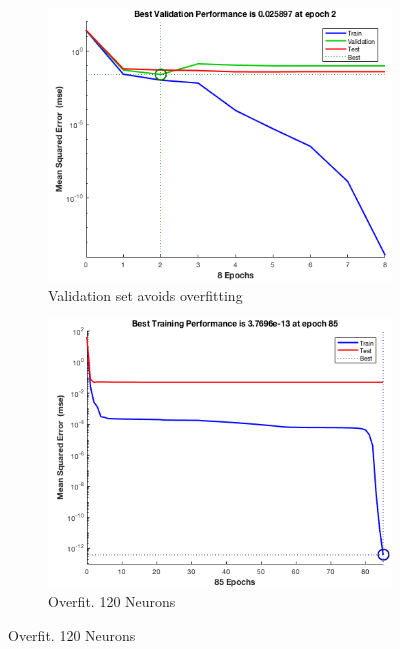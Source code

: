 \documentclass[a4paper, 10pt]{article}
\begin{document}
  \begin{figure}[h]
    \begin{adjustwidth}{-1.1cm}{-1.1cm}
    \centering
    \begin{subfigure}[t]{0.3\linewidth}
      \includegraphics[width=1\linewidth]{./lab1/overfit_stop.png}
      \caption{Validation set avoids overfitting}
      \label{fig:perfect_fit}
    \end{subfigure}
    \begin{subfigure}[t]{0.3\linewidth}
      \includegraphics[width=1\linewidth]{./lab1/overfit.png}
      \caption{Overfit. 120 Neurons}
      \label{fig:overfit}
    \end{subfigure}

\end{adjustwidth}
\end{figure}
\end{document}
